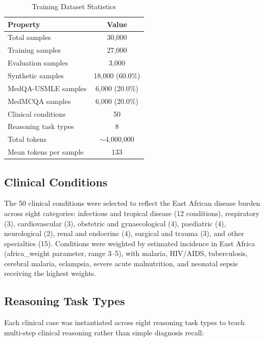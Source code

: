 \documentclass[conference]{IEEEtran}
\begin{document}
\begin{table}[h!]
\centering
\caption{Training Dataset Statistics}
\label{tab:dataset}
\begin{tabular}{lc}
\toprule
\textbf{Property} & \textbf{Value} \\
\midrule
Total samples            & 30{,}000 \\
Training samples         & 27{,}000 \\
Evaluation samples       & 3{,}000 \\
Synthetic samples        & 18{,}000 (60.0\%) \\
MedQA-USMLE samples      & 6{,}000 (20.0\%) \\
MedMCQA samples          & 6{,}000 (20.0\%) \\
Clinical conditions      & 50 \\
Reasoning task types     & 8 \\
Total tokens             & $\sim$4{,}000{,}000 \\
Mean tokens per sample   & 133 \\
\bottomrule
\end{tabular}
\end{table}

\subsection{Clinical Conditions}

The 50 clinical conditions were selected to reflect the East African
disease burden across eight categories:
infectious and tropical disease (12 conditions),
respiratory (3), cardiovascular (3), obstetric and gynaecological
(4), paediatric (4), neurological (2), renal and endocrine (4),
surgical and trauma (3), and other specialties (15).
Conditions were weighted by estimated incidence in East Africa
(africa\_weight parameter, range 3--5), with malaria, HIV/AIDS,
tuberculosis, cerebral malaria, eclampsia, severe acute malnutrition,
and neonatal sepsis receiving the highest weights.

\subsection{Reasoning Task Types}

Each clinical case was instantiated across eight reasoning task
types to teach multi-step clinical reasoning rather than simple
diagnosis recall:
\end{document}

